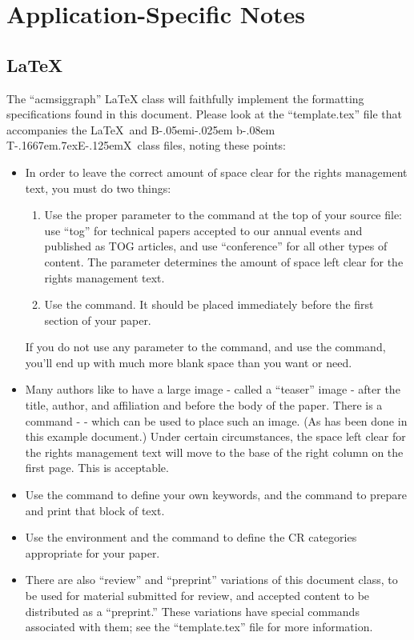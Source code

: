 \documentclass[tog]{acmsiggraph}
\def\BibTeX{{\rm B\kern-.05em{\sc i\kern-.025em b}\kern-.08em
    T\kern-.1667em\lower.7ex\hbox{E}\kern-.125emX}}
\begin{document}
\section{Application-Specific Notes}

\subsection{\LaTeX}

The ``acmsiggraph'' \LaTeX{} class will faithfully implement the formatting specifications found in this document. Please look at the ``template.tex'' file that accompanies the \LaTeX\ and \BibTeX\ class files, noting these points:
\begin{itemize}
\item In order to leave the correct amount of space clear for the rights management text, you must do two things: 
\begin{enumerate}
\item Use the proper parameter to the  command at the top of your source file: use ``tog'' for technical papers accepted to our annual events and published as TOG articles, and use ``conference'' for all other types of content. The parameter determines the amount of space left clear for the rights management text.
\item Use the  command. It should be placed immediately before the first section of your paper.
\end{enumerate}
If you do not use any parameter to the  command, and use the  command, you'll end up with much more blank space than you want or need.

\item Many authors like to have a large image - called a ``teaser'' image - after the title, author, and affiliation and before the body of the paper. There is a command -  - which can be used to place such an image. (As has been done in this example document.) Under certain circumstances, the space left clear for the rights management text will move to the base of the right column on the first page. This is acceptable.
\item Use the  command to define your own keywords, and the  command to prepare and print that block of text.
\item Use the  environment and the  command to define the CR categories appropriate for your paper.
\item There are also ``review'' and ``preprint'' variations of this document class, to be used for material submitted for review, and accepted content to be distributed as a ``preprint.'' These variations have special commands associated with them; see the ``template.tex'' file for more information.
\end{itemize}
\end{document}
